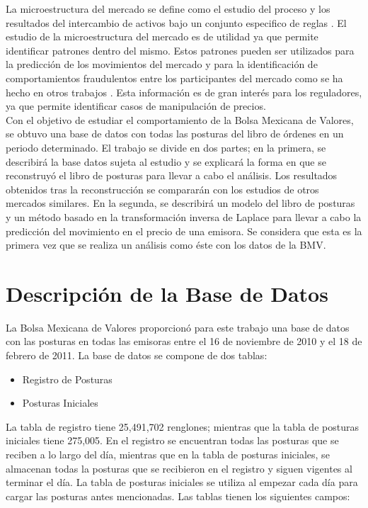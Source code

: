 \documentclass[11pt]{article}
\numberwithin{equation}{section} %
\begin{document}
La microestructura del mercado se define como el estudio del proceso y los resultados del intercambio de activos bajo un conjunto especifico de reglas \cite{1995market}. El estudio de la microestructura del mercado es de utilidad ya que permite identificar patrones dentro del mismo. Estos patrones pueden ser utilizados para la predicción de los movimientos del mercado y para la identificación de comportamientos fraudulentos entre los participantes del mercado como se ha hecho en otros trabajos \cite{manipulation}. Esta información es de gran interés para los reguladores, ya que permite identificar casos de manipulación de precios.
\\

Con el objetivo de estudiar el comportamiento de la Bolsa Mexicana de Valores, se obtuvo una base de datos con todas las posturas del libro de órdenes en un periodo determinado. El trabajo se divide en dos partes; en la primera, se describirá la base datos sujeta al estudio y se explicará la forma en que se reconstruyó el libro de posturas para llevar a cabo el análisis. Los resultados obtenidos tras la reconstrucción se compararán con los estudios de otros mercados similares. En la segunda, se describirá un modelo del libro de posturas y un método basado en la transformación inversa de Laplace para llevar a cabo la predicción del movimiento en el precio de una emisora. Se considera que esta es la primera vez que se realiza un análisis como éste con los datos de la BMV.

\clearpage

\section{Descripción de la Base de Datos}
La Bolsa Mexicana de Valores proporcionó para este trabajo una base de datos con las posturas en todas las emisoras entre el 16 de noviembre de 2010 y el 18 de febrero de 2011. La base de datos se compone de dos tablas:

\begin{itemize}
  \item Registro de Posturas
  \item Posturas Iniciales
\end{itemize}

La tabla de registro tiene 25,491,702 renglones; mientras que la tabla de posturas iniciales tiene 275,005. En el registro se encuentran todas las posturas que se reciben a lo largo del día, mientras que en la tabla de posturas iniciales, se almacenan todas la posturas que se recibieron en el registro y siguen vigentes al terminar el día. La tabla de posturas iniciales se utiliza al empezar cada día para cargar las posturas antes mencionadas. Las tablas tienen los siguientes campos:\\
\end{document}
